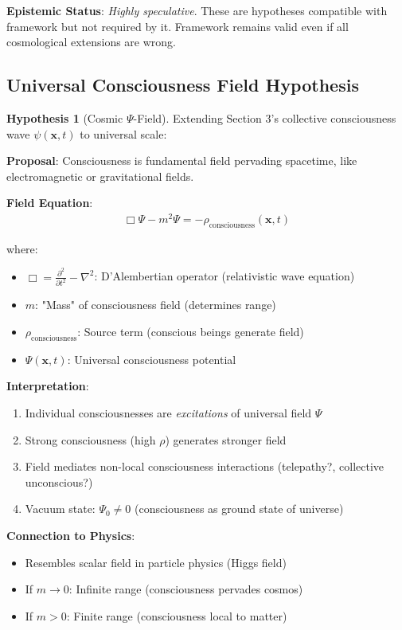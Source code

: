 \documentclass[11pt,a4paper]{article}
\theoremstyle{definition}
\newtheorem{hypothesis}{Hypothesis}[section]
\theoremstyle{remark}
\begin{document}
\begin{small}
\begin{enumerate}
\begin{mdframed}[backgroundcolor=cyan!5,linewidth=2pt]
\textbf{Epistemic Status}: \textit{Highly speculative}. These are hypotheses compatible with framework but not required by it. Framework remains valid even if all cosmological extensions are wrong.
\end{mdframed}

\subsection{Universal Consciousness Field Hypothesis}

\begin{hypothesis}[Cosmic \(\Psi\)-Field]
Extending Section 3's collective consciousness wave \(\psi(\mathbf{x}, t)\) to universal scale:

\textbf{Proposal}: Consciousness is fundamental field pervading spacetime, like electromagnetic or gravitational fields.

\textbf{Field Equation}:
\begin{align}
\Box \Psi - m^2 \Psi = -\rho_{\text{consciousness}}(\mathbf{x}, t)
\end{align}

where:
\begin{itemize}
    \item \(\Box = \frac{\partial^2}{\partial t^2} - \nabla^2\): D'Alembertian operator (relativistic wave equation)
    \item \(m\): "Mass" of consciousness field (determines range)
    \item \(\rho_{\text{consciousness}}\): Source term (conscious beings generate field)
    \item \(\Psi(\mathbf{x}, t)\): Universal consciousness potential
\end{itemize}

\textbf{Interpretation}:
\begin{enumerate}
    \item Individual consciousnesses are \textit{excitations} of universal field \(\Psi\)
    \item Strong consciousness (high \(\rho\)) generates stronger field
    \item Field mediates non-local consciousness interactions (telepathy?, collective unconscious?)
    \item Vacuum state: \(\Psi_0 \neq 0\) (consciousness as ground state of universe)
\end{enumerate}

\textbf{Connection to Physics}:
\begin{itemize}
    \item Resembles scalar field in particle physics (Higgs field)
    \item If \(m \to 0\): Infinite range (consciousness pervades cosmos)
    \item If \(m > 0\): Finite range (consciousness local to matter)
\end{itemize}
\end{hypothesis}


\end{enumerate}
\end{small}
\end{document}
